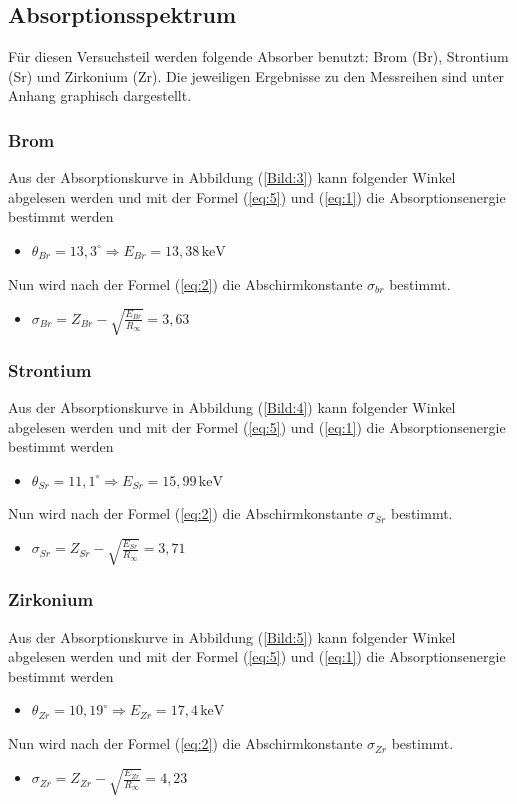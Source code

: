 \subsection{Absorptionsspektrum}
Für diesen Versuchsteil werden folgende Absorber benutzt: Brom (Br), Strontium (Sr) und Zirkonium (Zr).
Die jeweiligen Ergebnisse zu den Messreihen sind unter Anhang graphisch dargestellt.
\subsubsection{Brom}
Aus der Absorptionskurve in Abbildung (\ref{Bild:3}) kann folgender Winkel abgelesen werden und mit der Formel (\ref{eq:5}) und (\ref{eq:1}) die
Absorptionsenergie bestimmt werden
\begin{itemize}
  \item $\theta_{Br} = 13,3^\circ \Rightarrow E_{Br} = 13,38 \, \text{keV}$
\end{itemize}
Nun wird nach der Formel (\ref{eq:2}) die Abschirmkonstante $\sigma_{br}$ bestimmt.
\begin{itemize}
  \item $\sigma_{Br} = Z_{Br} - \sqrt{\frac{E_{Br}}{R_\infty}} = 3,63$
\end{itemize}
\subsubsection{Strontium}
Aus der Absorptionskurve in Abbildung (\ref{Bild:4}) kann folgender Winkel abgelesen werden und mit der Formel (\ref{eq:5}) und (\ref{eq:1}) die
Absorptionsenergie bestimmt werden
\begin{itemize}
  \item $\theta_{Sr} = 11,1^\circ \Rightarrow E_{Sr} = 15,99 \,\text{keV}$
\end{itemize}
Nun wird nach der Formel (\ref{eq:2}) die Abschirmkonstante $\sigma_{Sr}$ bestimmt.
\begin{itemize}
  \item $\sigma_{Sr} = Z_{Sr} - \sqrt{\frac{E_{Sr}}{R_\infty}} = 3,71$
\end{itemize}
\subsubsection{Zirkonium}
Aus der Absorptionskurve in Abbildung (\ref{Bild:5}) kann folgender Winkel abgelesen werden und mit der Formel (\ref{eq:5}) und (\ref{eq:1}) die
Absorptionsenergie bestimmt werden
\begin{itemize}
  \item $\theta_{Zr} = 10,19^\circ \Rightarrow E_{Zr} = 17,4 \, \text{keV}$
\end{itemize}
Nun wird nach der Formel (\ref{eq:2}) die Abschirmkonstante $\sigma_{Zr}$ bestimmt.
\begin{itemize}
  \item $\sigma_{Zr} = Z_{Zr} - \sqrt{\frac{E_{Zr}}{R_\infty}} = 4,23$
\end{itemize}

